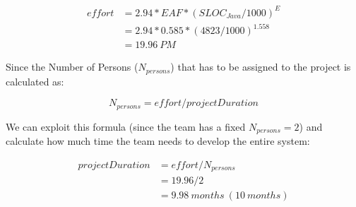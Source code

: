 \documentclass[../../../../projectPlan.tex]{subfiles}
\begin{document}
			\begin{align*}
				effort & = 2.94 * EAF * (SLOC_{Java}/1000)^E \\
                       & = 2.94 * 0.585 * (4823/1000)^{1.558} \\
                       & = 19.96\ PM
			\end{align*}

			Since the Number of Persons (\(N_{persons}\)) that has to be assigned to the project is calculated as:

			\[N_{persons} = effort / projectDuration \]

			We can exploit this formula (since the team has a fixed \(N_{persons} = 2\)) and calculate how much time the team needs to develop the entire system:

			\begin{align*}
				projectDuration & = effort / N_{persons} \\
				                & = 19.96 / 2 \\
				                & = 9.98\ months\ (10\ months)
			\end{align*}
\end{document}
